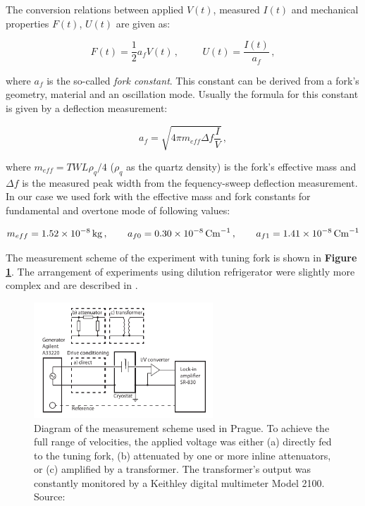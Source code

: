\newpage

The conversion relations between applied $V(t)$, measured $I(t)$ and mechanical properties $F(t)$, $U(t)$ are given \cite{forks} as:

\begin{equation}
F(t) = \frac{1}{2} a_{f} V(t)\,,
\hspace{1cm}
U(t) = \frac{I(t)}{a_{f}}\,,
\end{equation}

where $a_{f}$ is the so-called \textit{fork constant}. This constant can be derived from a fork's geometry, material and an oscillation mode. Usually the formula for this constant is given by a deflection measurement:

\begin{equation}
a_{f} = \sqrt{4\pi m_{eff} \Delta f \frac{I}{V}}\,,
\end{equation}

where $m_{eff} = TWL\rho_q /4$ ($\rho_q$ as the quartz density) is the fork's effective mass and $\Delta f$ is the measured peak width from the fequency-sweep deflection measurement. In our case we used fork with the effective mass and fork constants for fundamental and overtone mode of following values:

\begin{equation}
m_{eff} = 1.52 \times 10^{-8} \,\mathrm{kg}\,,
\hspace{7mm}
a_{f0} = 0.30 \times 10^{-8} \,\mathrm{Cm}^{-1}\,,
\hspace{7mm}
a_{f1} = 1.41 \times 10^{-8} \,\mathrm{Cm}^{-1}
\end{equation}

The measurement scheme of the experiment with tuning fork is shown in \textbf{Figure \ref{setup}}. The arrangement of experiments using dilution refrigerator were slightly more complex and are described in \cite{skyba} .

\begin{figure}[h]
	\centering
	\includegraphics[width=0.6\textwidth]{graphics/exp/fork_setup}
	\caption{Diagram of the measurement scheme used in Prague. To achieve the full range of velocities, the applied voltage was either (a) directly fed to the tuning fork, (b) attenuated by one or more inline attenuators, or (c) amplified by a transformer. The transformer’s output was constantly monitored by a Keithley digital multimeter Model 2100. Source: \cite{multiple-vels}}
	\label{setup}
\end{figure}

